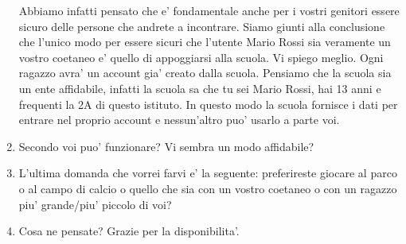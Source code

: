 \documentclass[12pt]{article}
\begin{document}
\begin{enumerate}
  Abbiamo infatti pensato che e' fondamentale anche per i vostri genitori essere sicuro delle persone che andrete a incontrare.
  Siamo giunti alla conclusione che l'unico modo per essere sicuri che l'utente Mario Rossi sia veramente un vostro coetaneo e' quello di appoggiarsi alla scuola.
  Vi spiego meglio. Ogni ragazzo avra' un account gia' creato dalla scuola. Pensiamo che la scuola sia un ente affidabile, infatti la scuola sa che tu sei Mario Rossi,
  hai 13 anni e frequenti la 2A di questo istituto. In questo modo la scuola fornisce i dati per entrare nel proprio account e nessun'altro puo' usarlo a parte voi.
  \item Secondo voi puo' funzionare? Vi sembra un modo affidabile?
  \item L'ultima domanda che vorrei farvi e' la seguente: preferireste giocare al parco o al campo di calcio o quello che sia con un vostro coetaneo o con un ragazzo piu'
  grande/piu' piccolo di voi?
  \item Cosa ne pensate? Grazie per la disponibilita'.
\end{enumerate}
\end{document}
